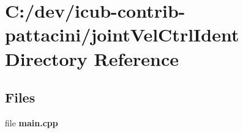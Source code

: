 \section{C\+:/dev/icub-\/contrib-\/pattacini/joint\+Vel\+Ctrl\+Ident Directory Reference}
\label{dir_2128e170c677658b7e11b00c5fe16bc5}
\subsection*{Files}
\begin{DoxyCompactItemize}
\item 
file {\bfseries main.\+cpp}
\end{DoxyCompactItemize}
